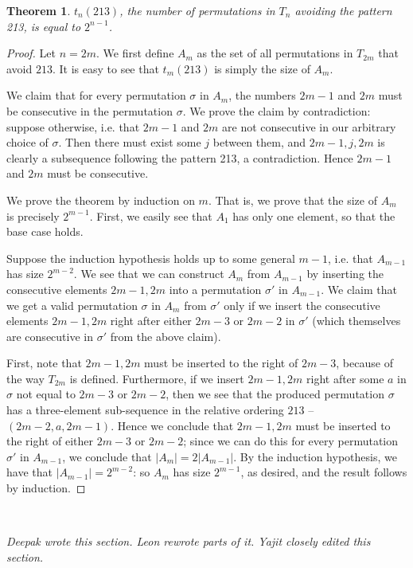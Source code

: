 \documentclass[11pt,letterpaper,twoside,english]{article}
\theoremstyle{theorem}
\newtheorem{theorem}{Theorem}[section]
\theoremstyle{remark}
\begin{document}
\begin{theorem}
$t_n(213)$, the number of permutations in $T_n$ avoiding the pattern 213, is equal to $2^{n-1}$.
\end{theorem}

\begin{proof}
Let $n=2m$. We first define $A_m$ as the set of all permutations in $T_{2m}$ that avoid $213$. It is easy to see that $t_m(213)$ is simply the size of $A_m$.

We claim that for every permutation $\sigma$ in $A_m$, the numbers $2m-1$ and $2m$ must be consecutive in the permutation $\sigma$. We prove the claim by contradiction: suppose otherwise, i.e. that $2m-1$ and $2m$ are not consecutive in our arbitrary choice of $\sigma$. Then there must exist some $j$ between them, and $2m-1, j, 2m$ is clearly a subsequence following the pattern 213, a contradiction. Hence $2m-1$ and $2m$ must be consecutive.

We prove the theorem by induction on $m$. That is, we prove that the size of $A_m$ is precisely $2^{m-1}$. First, we easily see that $A_1$ has only one element, so that the base case holds.

Suppose the induction hypothesis holds up to some general $m-1$, i.e. that $A_{m-1}$ has size $2^{m-2}$. We see that we can construct $A_m$ from $A_{m-1}$ by inserting the consecutive elements $2m-1, 2m$ into a permutation $\sigma'$ in $A_{m-1}$. We claim that we get a valid permutation $\sigma$ in $A_m$ from $\sigma'$ only if we insert the consecutive elements $2m-1, 2m$ right after either $2m-3$ or $2m-2$ in $\sigma'$ (which themselves are consecutive in $\sigma'$ from the above claim).

First, note that $2m-1, 2m$ must be inserted to the right of  $2m-3$, because of the way $T_{2m}$ is defined. Furthermore, if we insert $2m-1, 2m$ right after some $a$ in $\sigma$ not equal to $2m-3$ or $2m-2$, then we see that the produced permutation $\sigma$ has a three-element sub-sequence in the relative ordering $213$ -- $(2m-2, a, 2m-1)$. Hence we conclude that $2m-1, 2m$ must be inserted to the right of either $2m-3$ or $2m-2$; since we can do this for every permutation $\sigma'$ in $A_{m-1}$, we conclude that $|A_m| = 2|A_{m-1}|$. By the induction hypothesis, we have that $|A_{m-1}|=2^{m-2}$: so $A_m$ has size $2^{m-1}$, as desired, and the result follows by induction.
\end{proof}

\

\emph{Deepak wrote this section. Leon rewrote parts of it. Yajit closely edited this section.}
\end{document}
